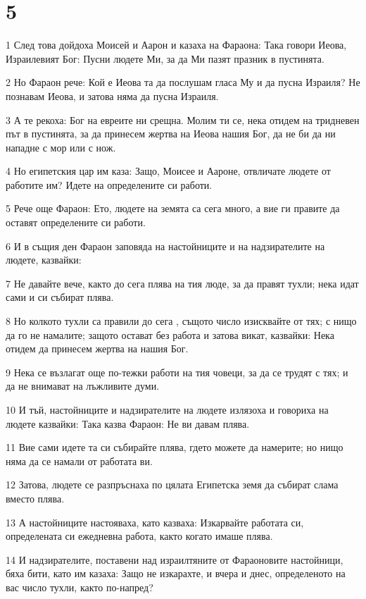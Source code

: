 \chapter{5}

\par 1 След това дойдоха Моисей и Аарон и казаха на Фараона: Така говори Иеова, Израилевият Бог: Пусни людете Ми, за да Ми пазят празник в пустинята.
\par 2 Но Фараон рече: Кой е Иеова та да послушам гласа Му и да пусна Израиля? Не познавам Иеова, и затова няма да пусна Израиля.
\par 3 А те рекоха: Бог на евреите ни срещна. Молим ти се, нека отидем на тридневен път в пустинята, за да принесем жертва на Иеова нашия Бог, да не би да ни нападне с мор или с нож.
\par 4 Но египетския цар им каза: Защо, Моисее и Аароне, отвличате людете от работите им? Идете на определените си работи.
\par 5 Рече още Фараон: Ето, людете на земята са сега много, а вие ги правите да оставят определените си работи.
\par 6 И в същия ден Фараон заповяда на настойниците и на надзирателите на людете, казвайки:
\par 7 Не давайте вече, както до сега плява на тия люде, за да правят тухли; нека идат сами и си събират плява.
\par 8 Но колкото тухли са правили до сега , същото число изисквайте от тях; с нищо да го не намалите; защото остават без работа и затова викат, казвайки: Нека отидем да принесем жертва на нашия Бог.
\par 9 Нека се възлагат още по-тежки работи на тия човеци, за да се трудят с тях; и да не внимават на лъжливите думи.
\par 10 И тъй, настойниците и надзирателите на людете излязоха и говориха на людете казвайки: Така казва Фараон: Не ви давам плява.
\par 11 Вие сами идете та си събирайте плява, гдето можете да намерите; но нищо няма да се намали от работата ви.
\par 12 Затова, людете се разпръснаха по цялата Египетска земя да събират слама вместо плява.
\par 13 А настойниците настояваха, като казваха: Изкарвайте работата си, определената си ежедневна работа, както когато имаше плява.
\par 14 И надзирателите, поставени над израилтяните от Фараоновите настойници, бяха бити, като им казаха: Защо не изкарахте, и вчера и днес, определеното на вас число тухли, както по-напред?
